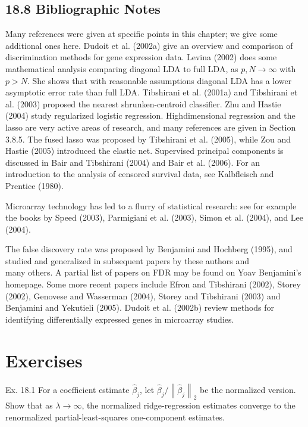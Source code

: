 \documentclass[10pt]{article}
\begin{document}
\subsection*{18.8 Bibliographic Notes}
Many references were given at specific points in this chapter; we give some additional ones here. Dudoit et al. (2002a) give an overview and comparison of discrimination methods for gene expression data. Levina (2002) does some mathematical analysis comparing diagonal LDA to full LDA, as $p, N \rightarrow \infty$ with $p>N$. She shows that with reasonable assumptions diagonal LDA has a lower asymptotic error rate than full LDA. Tibshirani et al. (2001a) and Tibshirani et al. (2003) proposed the nearest shrunken-centroid classifier. Zhu and Hastie (2004) study regularized logistic regression. Highdimensional regression and the lasso are very active areas of research, and many references are given in Section 3.8.5. The fused lasso was proposed by Tibshirani et al. (2005), while Zou and Hastie (2005) introduced the elastic net. Supervised principal components is discussed in Bair and Tibshirani (2004) and Bair et al. (2006). For an introduction to the analysis of censored survival data, see Kalbfleisch and Prentice (1980).

Microarray technology has led to a flurry of statistical research: see for example the books by Speed (2003), Parmigiani et al. (2003), Simon et al. (2004), and Lee (2004).

The false discovery rate was proposed by Benjamini and Hochberg (1995), and studied and generalized in subsequent papers by these authors and\\
many others. A partial list of papers on FDR may be found on Yoav Benjamini's homepage. Some more recent papers include Efron and Tibshirani (2002), Storey (2002), Genovese and Wasserman (2004), Storey and Tibshirani (2003) and Benjamini and Yekutieli (2005). Dudoit et al. (2002b) review methods for identifying differentially expressed genes in microarray studies.

\section*{Exercises}
Ex. 18.1 For a coefficient estimate $\hat{\beta}_{j}$, let $\hat{\beta}_{j} /\left\|\hat{\beta}_{j}\right\|_{2}$ be the normalized version. Show that as $\lambda \rightarrow \infty$, the normalized ridge-regression estimates converge to the renormalized partial-least-squares one-component estimates.
\end{document}
